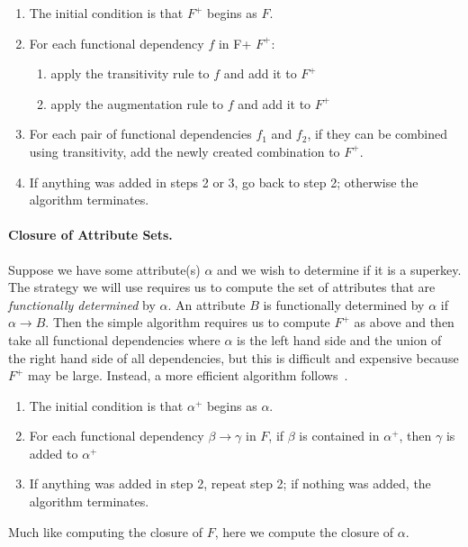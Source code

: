 \begin{enumerate}
	\item The initial condition is that $F^{+}$ begins as $F$.
	\item For each functional dependency $f$ in F+ $F^{+}$:
	\begin{enumerate}
		\item apply the transitivity rule to $f$ and add it to $F^{+}$
		\item apply the augmentation rule to $f$ and add it to $F^{+}$
	\end{enumerate}
	\item For each pair of functional dependencies $f_{1}$ and $f_{2}$, if they can be combined using transitivity, add the newly created combination to $F^{+}$.
	\item If anything was added in steps 2 or 3, go back to step 2; otherwise the algorithm terminates.
\end{enumerate}

\paragraph{Closure of Attribute Sets.} Suppose we have some attribute(s) $\alpha$ and we wish to determine if it is a superkey. The strategy we will use requires us to compute the set of attributes that are \textit{functionally determined} by $\alpha$. An attribute $B$ is functionally determined by $\alpha$ if $\alpha \rightarrow B$. Then the  simple algorithm requires us to compute $F^{+}$ as above and then take all functional dependencies where $\alpha$ is the left hand side and the union of the right hand side of all dependencies, but this is difficult and expensive because $F^{+}$ may be large. Instead, a more efficient algorithm follows~\cite{dsc}.

\begin{enumerate}
	\item The initial condition is that $\alpha^{+}$ begins as $\alpha$.
	\item For each functional dependency $\beta \rightarrow \gamma$ in $F$,
		if $\beta$ is contained in $\alpha^{+}$, then $\gamma$ is added to $\alpha^{+}$
	\item If anything was added in step 2, repeat step 2; if nothing was added, the algorithm terminates.
\end{enumerate}

Much like computing the closure of $F$, here we compute the closure of $\alpha$. 

